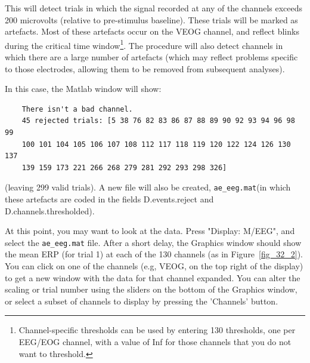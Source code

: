 This will detect trials in which the signal recorded at any of the channels exceeds 200 microvolts (relative to pre-stimulus baseline). These trials will be marked as artefacts. Most of these artefacts occur on the VEOG channel, and reflect blinks during the critical time window\footnote{Channel-specific thresholds can be used by entering 130 thresholds, one per EEG/EOG channel, with a value of Inf for those channels that you do not want to threshold.}. The procedure will also detect channels in which there are a large number of artefacts (which may reflect problems specific to those electrodes, allowing them to be removed from subsequent analyses).

In this case, the Matlab window will show:
\begin{verbatim}
	There isn't a bad channel.
	45 rejected trials: [5 38 76 82 83 86 87 88 89 90 92 93 94 96 98 99
    100 101 104 105 106 107 108 112 117 118 119 120 122 124 126 130 137
    139 159 173 221 266 268 279 281 292 293 298 326]
\end{verbatim}
(leaving 299 valid trials). A new file will also be created, \verb!ae_eeg.mat!(in which these artefacts are coded in the fields D.events.reject and D.channels.thresholded).

At this point, you may want to look at the data. Press "Display: M/EEG", and select the \verb!ae_eeg.mat! file. After a short delay, the Graphics window should show the mean ERP (for trial 1) at each of the 130 channels (as in Figure~\ref{fig_32_2}). You can click on one of the channels (e.g, VEOG, on the top right of the display) to get a new window with the data for that channel expanded. You can alter the scaling or trial number using the sliders on the bottom of the Graphics window, or select a subset of channels to display by pressing the 'Channels' button.

